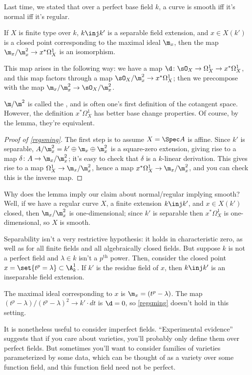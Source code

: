 Last time, we stated that over a perfect base field $k$, a curve is smooth iff it's normal iff it's regular.
\begin{lem}
\label{regsming}
If $X$ is finite type over $k$, $k\inj k'$ is a separable field extension, and $x\in X(k')$ is a closed point
corresponding to the maximal ideal $\m_x$, then the map $\m_x/\m_x^2\to x^*\Omega_X^1$ is an isomorphism.
\end{lem}
This map arises in the following way: we have a map $\d\colon\sO_X\to\Omega_X^1\to x^*\Omega_X^1$, and this map
factors through a map $\sO_X/\m_x^2\to x^*\Omega_X^1$; then we precompose with the map
$\m_x/\m_x^2\to\sO_X/\m_x^2$.
\begin{rem}
$\m/\m^2$ is called the , and is often one's first definition of the cotangent space.
However, the definition $x^*\Omega_X^1$ has better base change properties. Of course, by the lemma, they're
equivalent.
\end{rem}
\begin{proof}[Proof of \cref{regsming}]
The first step is to assume $X = \Spec A$ is affine. Since $k'$ is separable, $A/\m_x^2 = k'\oplus\m_x\oplus\m_x^2$
is a square-zero extension, giving rise to a map $\delta\colon A\to\m_x/\m_x^2$; it's easy to check that $\delta$
is a $k$-linear derivation. This gives rise to a map $\Omega_X^1\to\m_x/\m_x^2$, hence a map
$x^*\Omega_X^1\to\m_x/\m_x^2$, and you can check this is the inverse map.
\end{proof}
Why does the lemma imply our claim about normal/regular implying smooth? Well, if we have a regular curve $X$, a
finite extension $k\inj k'$, and $x\in X(k')$ closed, then $\m_x/\m_x^2$ is one-dimensional; since $k'$ is
separable then $x^*\Omega_X^1$ is one-dimensional, so $X$ is smooth.
\begin{exm}
Separability isn't a very restrictive hypothesis: it holds in characteristic zero, as well as for all finite fields
and all algebraically closed fields. But suppose $k$ is not a perfect field and $\lambda\in k$ isn't a
$p^{\mathrm{th}}$ power. Then, consider the closed point $x = \set{t^p = \lambda}\subset\A_k^1$. If $k'$ is the
residue field of $x$, then $k\inj k'$ is an inseparable field extension.

The maximal ideal corresponding to $x$ is $\m_x = (t^p-\lambda)$. The map $(t^p-\lambda)/(t^p-\lambda)^2\to k'\cdot
dt$ is $\d = 0$, so \cref{regsming} doesn't hold in this setting.
\end{exm}
It is nonetheless useful to consider imperfect fields. ``Experimental evidence'' suggests that if you care about
varieties, you'll probably only define them over perfect fields. But sometimes you'll want to consider families of
varieties parameterized by some data, which can be thought of as a variety over some function field, and this
function field need not be perfect.


